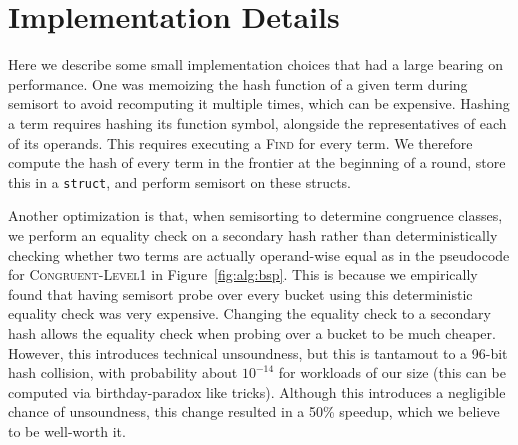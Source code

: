 \section{Implementation Details}
\label{sec:impl}

Here we describe some small implementation choices that had a large bearing on
performance. One was memoizing the hash function of a given term during semisort
to avoid recomputing it multiple times, which can be expensive. Hashing a term
requires hashing its function symbol, alongside the representatives of each of
its operands. This requires executing a \textsc{Find} for every term. We
therefore compute the hash of every term in the frontier at the beginning of a
round, store this in a \texttt{struct}, and perform semisort on these structs. 


Another optimization is that, when semisorting to determine congruence classes,
we perform an equality check on a secondary hash rather than deterministically
checking whether two terms are actually operand-wise equal as in the pseudocode
for \textsc{Congruent-Level1} in Figure~\ref{fig:alg:bsp}. This is because we
empirically found that having semisort probe over every bucket using this
deterministic equality check was very expensive. Changing the equality check to
a secondary hash allows the equality check when probing over a bucket to be much
cheaper. However, this introduces technical unsoundness, but this is tantamout
to a 96-bit hash collision, with probability about $10^{-14}$ for workloads of
our size (this can be computed via birthday-paradox like tricks). Although this
introduces a negligible chance of unsoundness, this change resulted in a 50\%
speedup, which we believe to be well-worth it.
